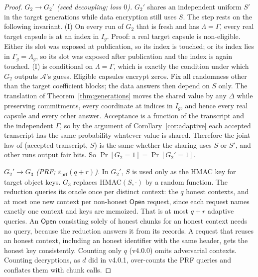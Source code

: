 \documentclass[pdflatex,sn-mathphys-num,twocolumn]{sn-jnl}
\theoremstyle{plain}
\theoremstyle{definition}
\begin{document}
\begin{proof}
\emph{$G_2\to G_2'$ (seed decoupling; loss $0$).} $G_2'$ shares an independent uniform $S'$ in the target generations while data encryption still uses $S$. The step rests on the following invariant. (I) On every run of $G_2$ that is fresh and has $\Lambda=\Gamma$, every real target capsule is at an index in $I_g$. Proof: a real target capsule is non-eligible. Either its slot was exposed at publication, so its index is touched; or its index lies in $\Gamma_g=\Lambda_g$, so its slot was exposed after publication and the index is again touched. (I) is conditional on $\Lambda=\Gamma$, which is exactly the condition under which $G_2$ outputs $\mathcal A$'s guess. Eligible capsules encrypt zeros. Fix all randomness other than the target coefficient blocks; the data answers then depend on $S$ only. The translation of Theorem~\ref{thm:generations} moves the shared value by any $\Delta$ while preserving commitments, every coordinate at indices in $I_g$, and hence every real capsule and every other answer. Acceptance is a function of the transcript and the independent $\Gamma$, so by the argument of Corollary~\ref{cor:adaptive} each accepted transcript has the same probability whatever value is shared. Therefore the joint law of (accepted transcript, $S$) is the same whether the sharing uses $S$ or $S'$, and other runs output fair bits. So $\Pr[G_2=1]=\Pr[G_2'=1]$.

\emph{$G_2'\to G_3$ (PRF; $\varepsilon_{\mathrm{prf}}(q+r)$).} In $G_2'$, $S$ is used only as the HMAC key for target object keys. $G_3$ replaces HMAC$(S,\cdot)$ by a random function. The reduction queries its oracle once per distinct context: the $q$ honest contexts, and at most one new context per non-honest $\mathsf{Open}$ request, since each request names exactly one context and keys are memoized. That is at most $q+r$ adaptive queries. An $\mathsf{Open}$ consisting solely of honest chunks for an honest context needs no query, because the reduction answers it from its records. A request that reuses an honest context, including an honest identifier with the same header, gets the honest key consistently. Counting only $q$ (v4.0.0) omits adversarial contexts. Counting decryptions, as $d$ did in v4.0.1, over-counts the PRF queries and conflates them with chunk calls.


\end{proof}
\end{document}
